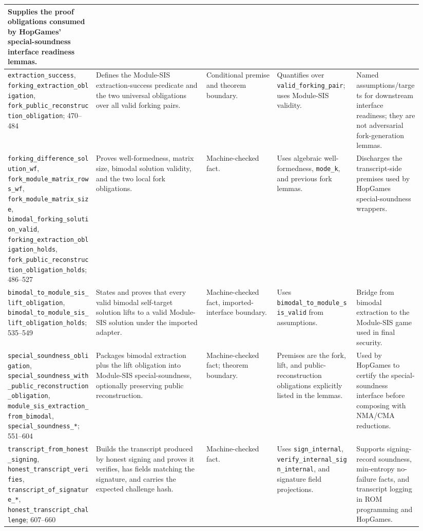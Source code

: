 \documentclass[11pt]{report}
\DeclareRobustCommand{\ec}[1]{\ifmmode\text{\nolinkurl{#1}}\else\nolinkurl{#1}\fi}
\theoremstyle{definition}
\theoremstyle{plain}
\begin{document}
\begin{longtable}{p{0.20\linewidth}p{0.25\linewidth}p{0.16\linewidth}p{0.18\linewidth}p{0.15\linewidth}}
Supplies the proof obligations consumed by HopGames' special-soundness
interface readiness lemmas. \\
\midrule
\ec{extraction\_success}, \ec{forking\_extraction\_obligation},
\ec{fork\_public\_reconstruction\_obligation}; 470--484 &
Defines the Module-SIS extraction-success predicate and the two universal
obligations over all valid forking pairs. &
Conditional premise and theorem boundary. &
Quantifies over \ec{valid\_forking\_pair}; uses Module-SIS validity. &
Named assumptions/targets for downstream interface readiness; they are not
adversarial fork-generation lemmas. \\
\midrule
\ec{forking\_difference\_solution\_wf},
\ec{fork\_module\_matrix\_rows\_wf},
\ec{fork\_module\_matrix\_size},
\ec{bimodal\_forking\_solution\_valid},
\ec{forking\_extraction\_obligation\_holds},
\ec{fork\_public\_reconstruction\_obligation\_holds}; 486--527 &
Proves well-formedness, matrix size, bimodal solution validity, and the two
local fork obligations. &
Machine-checked fact. &
Uses algebraic well-formedness, \ec{mode\_k}, and previous fork lemmas. &
Discharges the transcript-side premises used by HopGames special-soundness
wrappers. \\
\midrule
\ec{bimodal\_to\_module\_sis\_lift\_obligation},
\ec{bimodal\_to\_module\_sis\_lift\_obligation\_holds}; 535--549 &
States and proves that every valid bimodal self-target solution lifts to a
valid Module-SIS solution under the imported adapter. &
Machine-checked fact, imported-interface boundary. &
Uses \ec{bimodal\_to\_module\_sis\_valid} from assumptions. &
Bridge from bimodal extraction to the Module-SIS game used in final security. \\
\midrule
\ec{special\_soundness\_obligation},
\ec{special\_soundness\_with\_public\_reconstruction\_obligation},
\ec{module\_sis\_extraction\_from\_bimodal},
\ec{special\_soundness\_*}; 551--604 &
Packages bimodal extraction plus the lift obligation into Module-SIS
special-soundness, optionally preserving public reconstruction. &
Machine-checked fact; theorem boundary. &
Premises are the fork, lift, and public-reconstruction obligations explicitly
listed in the lemmas. &
Used by HopGames to certify the special-soundness interface before composing
with NMA/CMA reductions. \\
\midrule
\ec{transcript\_from\_honest\_signing},
\ec{honest\_transcript\_verifies},
\ec{transcript\_of\_signature\_*},
\ec{honest\_transcript\_challenge}; 607--660 &
Builds the transcript produced by honest signing and proves it verifies, has
fields matching the signature, and carries the expected challenge hash. &
Machine-checked fact. &
Uses \ec{sign\_internal}, \ec{verify\_internal\_sign\_internal}, and signature
field projections. &
Supports signing-record soundness, min-entropy no-failure facts, and transcript
logging in ROM programming and HopGames. \\
\bottomrule
\end{longtable}
\end{document}
